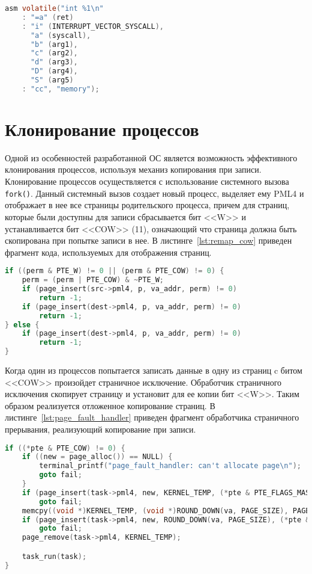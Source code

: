 \begin{lstlisting}[language=C,
caption={Выполнение системных вызовов},
label={lst:syscall}]
asm volatile("int %1\n"
	: "=a" (ret)
	: "i" (INTERRUPT_VECTOR_SYSCALL),
	  "a" (syscall),
	  "b" (arg1),
	  "c" (arg2),
	  "d" (arg3),
	  "D" (arg4),
	  "S" (arg5)
	: "cc", "memory");
\end{lstlisting}

\section{Клонирование процессов}
Одной из особенностей разработанной ОС является возможность эффективного клонирования
процессов, используя механиз копирования при записи. Клонирование процессов
осуществляется с использование системного вызова \texttt{fork()}. Данный системный
вызов создает новый процесс, выделяет ему PML4 и отображает в нее все страницы
родительского процесса, причем для страниц, которые были доступны для записи сбрасывается
бит <<W>> и устанавливается бит <<COW>> (11), означающий что страница должна быть
скопирована при попытке записи в нее. В листинге~\ref{lst:remap_cow} приведен фрагмент кода,
используемых для отображения страниц.

\begin{lstlisting}[language=C,
caption={Отображение страниц для реализации копирования при записи},
label={lst:remap_cow}]
if ((perm & PTE_W) != 0 || (perm & PTE_COW) != 0) {
	perm = (perm | PTE_COW) & ~PTE_W;
	if (page_insert(src->pml4, p, va_addr, perm) != 0)
		return -1;
	if (page_insert(dest->pml4, p, va_addr, perm) != 0)
		return -1;
} else {
	if (page_insert(dest->pml4, p, va_addr, perm) != 0)
		return -1;
}
\end{lstlisting}


Когда один из процессов попытается записать данные в одну из страниц c битом <<COW>> произойдет страничное
исключение. Обработчик страничного исключения скопирует страницу и установит для ее копии бит <<W>>.
Таким образом реализуется отложенное копирование страниц. В листинге~\ref{lst:page_fault_handler}
приведен фрагмент обработчика страничного прерывания, реализующий копирование при записи.

\begin{lstlisting}[language=C,
caption={Фрагмент обработчика страничного исключения},
label={lst:page_fault_handler}]
if ((*pte & PTE_COW) != 0) {
	if ((new = page_alloc()) == NULL) {
		terminal_printf("page_fault_handler: can't allocate page\n");
		goto fail;
	}
	if (page_insert(task->pml4, new, KERNEL_TEMP, (*pte & PTE_FLAGS_MASK)| PTE_W) != 0)
		goto fail;
	memcpy((void *)KERNEL_TEMP, (void *)ROUND_DOWN(va, PAGE_SIZE), PAGE_SIZE);
	if (page_insert(task->pml4, new, ROUND_DOWN(va, PAGE_SIZE), (*pte & PTE_FLAGS_MASK) | PTE_W) != 0)
		goto fail;
	page_remove(task->pml4, KERNEL_TEMP);

	task_run(task);
}
\end{lstlisting}


